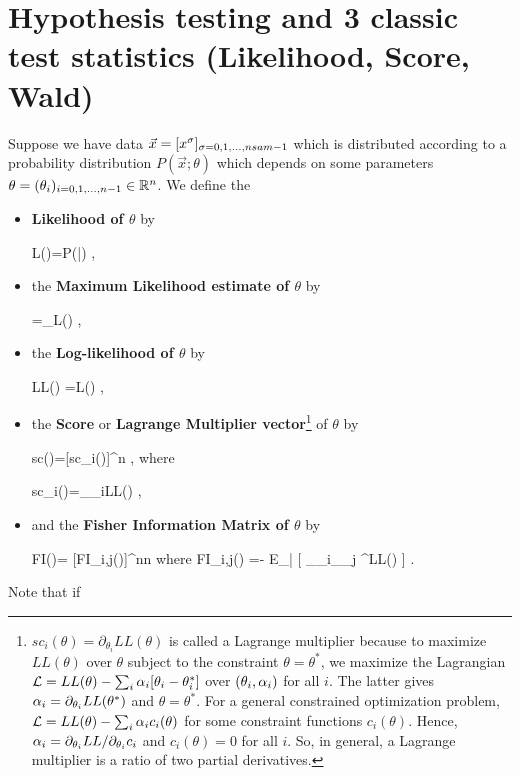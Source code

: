 \section{Hypothesis testing and 3 classic test statistics 
(Likelihood, Score, Wald)}

Suppose we have 
data $\vec{x}=[x^\sigma]_{\sigma=0, 1, \ldots, 
nsam-1}$ which is distributed
according to 
a probability distribution
$P(\vec{x};\theta)$
which depends
on some parameters $\theta=
(\theta_i)_{i=0, 1, \ldots,n-1}\in { \mathbb{R}}^n$.
We define the
\begin{itemize}
\item
{\bf Likelihood of $\theta$} by

\beq
L(\theta)=P(|\theta)
\;,
\eeq
\item
the {\bf Maximum Likelihood estimate
of $\theta$} by

\beq
\hat{\theta}=\argmax_\theta L(\theta)
\;,
\eeq
\item
the
{\bf Log-likelihood of $\theta$} by

\beq
LL(\theta) =\ln L(\theta)
\;,
\eeq
\item
the {\bf Score} or {\bf Lagrange
Multiplier vector}\footnote{$sc_i(\theta)=
\partial_{\theta_i}LL(\theta)$
is called a Lagrange multiplier
because to maximize $LL(\theta)$
over $\theta$ subject to
the constraint $\theta=\theta^*$,
we maximize
the Lagrangian ${\cal L}= LL(\theta) 
-\sum_i \alpha_i[\theta_i - \theta^*_i]$ over 
$(\theta_i,\alpha_i)$ for all $i$. The latter
gives $\alpha_i=\partial_{\theta_i}LL(\theta^*)$
and $\theta=\theta^*$.
For a general
constrained optimization
problem, ${\cal L}=LL(\theta)-\sum_i \alpha_ic_i(\theta)$
for some constraint functions $c_i(\theta)$.
Hence, $\alpha_i=\partial_{\theta_i}LL/
\partial_{\theta_i}c_i$
and $c_i(\theta)=0$
for all $i$.
So, in general,
a Lagrange multiplier
is a ratio of two partial
derivatives.} of $\theta$ by 

\beq
sc(\theta)=[sc_i(\theta)]\in \RR^n
\;,
\eeq
where

\beq
sc_i(\theta)=\partial_{\theta_i}LL(\theta)
\;,
\eeq
\item
and the
{\bf Fisher Information Matrix
of $\theta$} by

\beq
FI(\theta)= [FI_{i,j}(\theta)]\in \RR^{n\times n}
\eeq
where 
\beq
FI_{i,j}(\theta)
=-
E_{\vec{\rvx}|\theta}
[
\partial_{\theta_i}\partial_{\theta_j}
^{LL(\theta)}
]
\;.
\eeq
\end{itemize}

Note that if 

